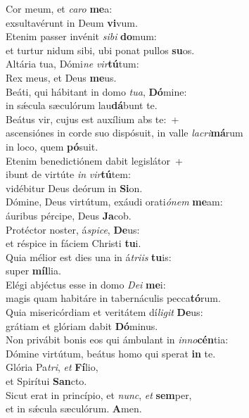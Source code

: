 \evenverse Cor meum, et \textit{ca}\textit{ro} \textbf{me}a:~\*\\
\evenverse exsultavérunt in Deum \textbf{vi}vum.\\
\oddverse Etenim passer invénit \textit{si}\textit{bi} \textbf{do}mum:~\*\\
\oddverse et turtur nidum sibi, ubi ponat pullos \textbf{su}os.\\
\evenverse Altária tua, Dómi\textit{ne} \textit{vir}\textbf{tú}tum:~\*\\
\evenverse Rex meus, et Deus \textbf{me}us.\\
\oddverse Beáti, qui hábitant in domo \textit{tu}\textit{a}, \textbf{Dó}mine:~\*\\
\oddverse in sǽcula sæculórum lau\textbf{dá}bunt te.\\
\evenverse Beátus vir, cujus est auxílium abs te:~+\\
\evenverse  ascensiónes in corde suo dispósuit, in valle \textit{la}\textit{cri}\textbf{má}rum~\*\\
\evenverse in loco, quem \textbf{pó}suit.\\
\oddverse Etenim benedictiónem dabit legislátor~+\\
\oddverse  ibunt de virtúte \textit{in} \textit{vir}\textbf{tú}tem:~\*\\
\oddverse vidébitur Deus deórum in \textbf{Si}on.\\
\evenverse Dómine, Deus virtútum, exáudi orati\textit{ó}\textit{nem} \textbf{me}am:~\*\\
\evenverse áuribus pércipe, Deus \textbf{Ja}cob.\\
\oddverse Protéctor noster, á\textit{spi}\textit{ce}, \textbf{De}us:~\*\\
\oddverse et réspice in fáciem Christi \textbf{tu}i.\\
\evenverse Quia mélior est dies una in á\textit{tri}\textit{is} \textbf{tu}is:~\*\\
\evenverse super \textbf{míl}lia.\\
\oddverse Elégi abjéctus esse in domo \textit{De}\textit{i} \textbf{me}i:~\*\\
\oddverse magis quam habitáre in tabernáculis pecca\textbf{tó}rum.\\
\evenverse Quia misericórdiam et veritátem dí\textit{li}\textit{git} \textbf{De}us:~\*\\
\evenverse grátiam et glóriam dabit \textbf{Dó}minus.\\
\oddverse Non privábit bonis eos qui ámbulant in \textit{in}\textit{no}\textbf{cén}tia:~\*\\
\oddverse Dómine virtútum, beátus homo qui sperat \textbf{in} te.\\
\evenverse Glória Pa\textit{tri}, \textit{et} \textbf{Fí}lio,~\*\\
\evenverse et Spirítui \textbf{San}cto.\\
\oddverse Sicut erat in princípio, et \textit{nunc}, \textit{et} \textbf{sem}per,~\*\\
\oddverse et in sǽcula sæculórum. \textbf{A}men.\\
